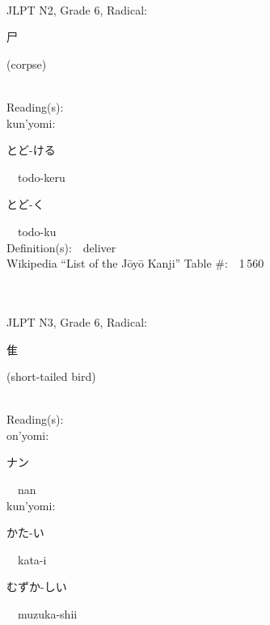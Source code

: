 \begin{multicols}{2}
{\fontsize{34pt}{40pt}  }\ \ \\  %
{JLPT N2, Grade 6, Radical:\ \ {\begin{CJK}{UTF8}{min} 尸 \end{CJK}} (corpse) } \\
Reading(s):\ \ \\
{\hspace*{1em}}kun'yomi:\ \ \\
{\hspace*{2em}}{\begin{CJK}{UTF8}{min} とど-ける \end{CJK}}\ \ todo-keru\ \ \\
{\hspace*{2em}}{\begin{CJK}{UTF8}{min} とど-く \end{CJK}}\ \ todo-ku\ \ \\
Definition(s):\ \ deliver \\
Wikipedia ``List of the J\=oy\=o Kanji'' Table \#:\ \ 1\,560 \\
\ \ \\
{\fontsize{34pt}{40pt}  }\ \ \\  %
{JLPT N3, Grade 6, Radical:\ \ {\begin{CJK}{UTF8}{min} 隹 \end{CJK}} (short-tailed bird) } \\
Reading(s):\ \ \\
{\hspace*{1em}}on'yomi:\ \ \\
{\hspace*{2em}}{\begin{CJK}{UTF8}{min} ナン \end{CJK}}\ \ nan\ \ \\
{\hspace*{1em}}kun'yomi:\ \ \\
{\hspace*{2em}}{\begin{CJK}{UTF8}{min} かた-い \end{CJK}}\ \ kata-i\ \ \\
{\hspace*{2em}}{\begin{CJK}{UTF8}{min} むずか-しい \end{CJK}}\ \ muzuka-shii\ \ \\

\end{multicols}
